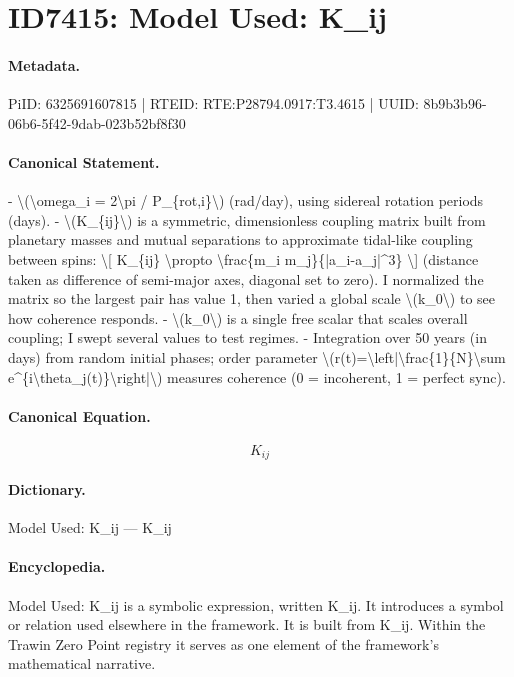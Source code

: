 \section*{ID7415: Model Used: K\_ij}
\paragraph{Metadata.}
PiID: 6325691607815 | RTEID: RTE:P28794.0917:T3.4615 | UUID: 8b9b3b96-06b6-5f42-9dab-023b52bf8f30

\paragraph{Canonical Statement.}
- \textbackslash{}(\textbackslash{}omega\_i = 2\textbackslash{}pi / P\_\{rot,i\}\textbackslash{}) (rad/day), using sidereal rotation periods (days). - \textbackslash{}(K\_\{ij\}\textbackslash{}) is a symmetric, dimensionless coupling matrix built from planetary masses and mutual separations to approximate tidal-like coupling between spins: \textbackslash{}[ K\_\{ij\} \textbackslash{}propto \textbackslash{}frac\{m\_i m\_j\}\{|a\_i-a\_j|\textasciicircum{}3\} \textbackslash{}] (distance taken as difference of semi-major axes, diagonal set to zero). I normalized the matrix so the largest pair has value 1, then varied a global scale \textbackslash{}(k\_0\textbackslash{}) to see how coherence responds. - \textbackslash{}(k\_0\textbackslash{}) is a single free scalar that scales overall coupling; I swept several values to test regimes. - Integration over 50 years (in days) from random initial phases; order parameter \textbackslash{}(r(t)=\textbackslash{}left|\textbackslash{}frac\{1\}\{N\}\textbackslash{}sum e\textasciicircum{}\{i\textbackslash{}theta\_j(t)\}\textbackslash{}right|\textbackslash{}) measures coherence (0 = incoherent, 1 = perfect sync).

\paragraph{Canonical Equation.}
\[
K_{ij}
\]

\paragraph{Dictionary.}
Model Used: K\_ij — K\_ij

\paragraph{Encyclopedia.}
Model Used: K\_ij is a symbolic expression, written K\_ij. It introduces a symbol or relation used elsewhere in the framework. It is built from K\_ij. Within the Trawin Zero Point registry it serves as one element of the framework's mathematical narrative.
